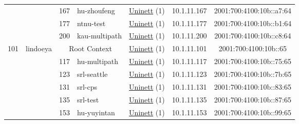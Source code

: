 \begin{small}
\begin{center}
\begin{longtable}{|c|c|c|c|c|c|c|c|}
  &  & \tiny{167} & \multicolumn{1}{|l|}{\tiny{hu-zhoufeng}} & \multicolumn{2}{|c|}{\tiny{\href{https://www.uninett.no}{Uninett} (1)}} & \tiny{10.1.11.167} & \tiny{2001:700:4100:10b::a7:64} \\* \cline{3-3}\cline{4-4}\cline{5-5}\cline{6-6}\cline{7-7}\cline{8-8}
  &  & \tiny{177} & \multicolumn{1}{|l|}{\tiny{ntnu-test}} & \multicolumn{2}{|c|}{\tiny{\href{https://www.uninett.no}{Uninett} (1)}} & \tiny{10.1.11.177} & \tiny{2001:700:4100:10b::b1:64} \\* \cline{3-3}\cline{4-4}\cline{5-5}\cline{6-6}\cline{7-7}\cline{8-8}
  &  & \tiny{200} & \multicolumn{1}{|l|}{\tiny{kau-multipath}} & \multicolumn{2}{|c|}{\tiny{\href{https://www.uninett.no}{Uninett} (1)}} & \tiny{10.1.11.200} & \tiny{2001:700:4100:10b::c8:64} \\ \hline
 \multirow{13}{*}{\tiny{101}} & \multicolumn{1}{|l|}{\multirow{13}{*}{\tiny{lindoeya}}} & \multicolumn{2}{|c|}{\tiny{Root Context}} & \multicolumn{2}{|c|}{\tiny{\href{https://www.uninett.no}{Uninett} (1)}} & \tiny{10.1.11.101} & \tiny{2001:700:4100:10b::65} \\* \cline{3-3}\cline{4-4}\cline{5-5}\cline{6-6}\cline{7-7}\cline{8-8}
  &  & \tiny{117} & \multicolumn{1}{|l|}{\tiny{hu-multipath}} & \multicolumn{2}{|c|}{\tiny{\href{https://www.uninett.no}{Uninett} (1)}} & \tiny{10.1.11.117} & \tiny{2001:700:4100:10b::75:65} \\* \cline{3-3}\cline{4-4}\cline{5-5}\cline{6-6}\cline{7-7}\cline{8-8}
  &  & \tiny{123} & \multicolumn{1}{|l|}{\tiny{srl-seattle}} & \multicolumn{2}{|c|}{\tiny{\href{https://www.uninett.no}{Uninett} (1)}} & \tiny{10.1.11.123} & \tiny{2001:700:4100:10b::7b:65} \\* \cline{3-3}\cline{4-4}\cline{5-5}\cline{6-6}\cline{7-7}\cline{8-8}
  &  & \tiny{131} & \multicolumn{1}{|l|}{\tiny{srl-cps}} & \multicolumn{2}{|c|}{\tiny{\href{https://www.uninett.no}{Uninett} (1)}} & \tiny{10.1.11.131} & \tiny{2001:700:4100:10b::83:65} \\* \cline{3-3}\cline{4-4}\cline{5-5}\cline{6-6}\cline{7-7}\cline{8-8}
  &  & \tiny{135} & \multicolumn{1}{|l|}{\tiny{srl-test}} & \multicolumn{2}{|c|}{\tiny{\href{https://www.uninett.no}{Uninett} (1)}} & \tiny{10.1.11.135} & \tiny{2001:700:4100:10b::87:65} \\* \cline{3-3}\cline{4-4}\cline{5-5}\cline{6-6}\cline{7-7}\cline{8-8}
  &  & \tiny{153} & \multicolumn{1}{|l|}{\tiny{hu-yuyintan}} & \multicolumn{2}{|c|}{\tiny{\href{https://www.uninett.no}{Uninett} (1)}} & \tiny{10.1.11.153} & \tiny{2001:700:4100:10b::99:65} \\* \cline{3-3}\cline{4-4}\cline{5-5}\cline{6-6}\cline{7-7}\cline{8-8}

\end{longtable}
\end{center}
\end{small}
